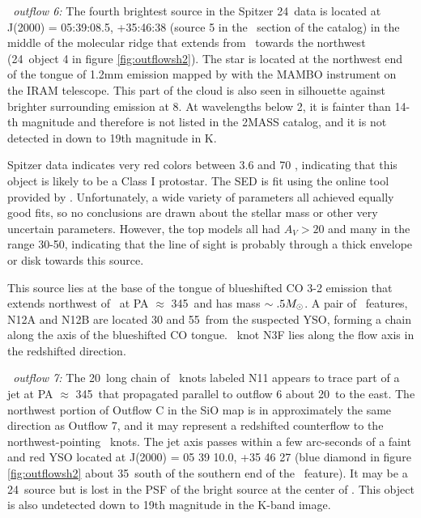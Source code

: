  {\it \region\ outflow 6:} The fourth brightest source in the Spitzer 24\um\ 
 data is located at J(2000) = 05:39:08.5, +35:46:38 (source 5 in the \region\ 
 section of the \citet{qiu2008} catalog) in the middle of the
 molecular ridge that extends from \region\ towards the northwest (24\um\ 
 object 4 in figure \ref{fig:outflowsh2}).   The star is
 located at the northwest end of the tongue of 1.2mm emission mapped by
 \citep{beuther2002} with the MAMBO instrument on the IRAM telescope.  This
 part of the cloud is also seen in silhouette against brighter surrounding
 emission at 8\um.  At wavelengths below 2\um, it is fainter than 14-th
 magnitude and therefore is not listed in the 2MASS catalog, and it is not
 detected in \citet{yan2009} down to 19th magnitude in K.
 
 Spitzer data indicates very red colors between 3.6 and 70 \um, indicating that
 this object is likely to be a Class I protostar.  The SED is fit using the
 online tool provided by \citet{robitaille2007}.  Unfortunately, a wide variety
 of parameters all achieved equally good fits, so no conclusions are drawn
 about the stellar mass or other very uncertain parameters.  However, the top
 models all had $A_V > 20$ and many in the range 30-50, indicating that the
 line of sight is probably through a thick envelope or disk towards this
 source.  

 
 This source lies at the base of the tongue of blueshifted CO 3-2
 emission that extends northwest of \region\ at PA $\approx$ 345\arcdeg\  and
 has mass $\sim .5M_{\odot}$.  A pair of \htwo\ features,
 \citet{khanzadyan2004} N12A and N12B are located 30 and 55\arcsec\ from the
 suspected YSO, forming a chain along the axis of the blueshifted CO
 tongue.    \citet{khanzadyan2004} \htwo\ knot N3F lies along the flow axis in
 the redshifted direction.
 
{\it \region\ outflow 7:} The 20\arcsec\ long chain of \htwo\ knots labeled
\citet{khanzadyan2004} N11 appears to trace part of a jet at PA $\approx$
345\arcdeg\ that propagated parallel to outflow 6 about 20\arcsec\ to the east.
The northwest portion of Outflow C in the \citet{beuther2002} SiO map is in 
approximately the same direction as Outflow 7, and it may represent a redshifted
counterflow to the northwest-pointing \hh\ knots.
The jet axis passes within a few arc-seconds of a faint and red YSO located at
J(2000) = 05 39 10.0, +35 46 27 (blue diamond in figure \ref{fig:outflowsh2}
about 35\arcsec\ south of the southern end of the \htwo\ feature).  It may be a
24\um\ source but is lost in the PSF of the bright source at the center of
\necluster.  This object is also undetected down to 19th magnitude in the
\citet{yan2009} K-band image.
 
